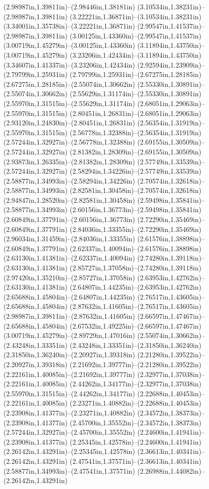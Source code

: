 (2.98987in,1.39811in)--(2.98446in,1.38181in) (3.10534in,1.38231in)--(2.98987in,1.39811in) (3.22221in,1.36871in)--(3.10534in,1.38231in) (3.34001in,1.35738in)--(3.22221in,1.36871in) (2.99547in,1.41537in)--(2.98987in,1.39811in) (3.00125in,1.43360in)--(2.99547in,1.41537in) (3.00719in,1.45279in)--(3.00125in,1.43360in) (3.11894in,1.43750in)--(3.00719in,1.45279in) (3.23206in,1.42434in)--(3.11894in,1.43750in) (3.34607in,1.41337in)--(3.23206in,1.42434in) (2.92594in,1.23909in)--(2.79799in,1.25931in) (2.79799in,1.25931in)--(2.67275in,1.28185in) (2.67275in,1.28185in)--(2.55074in,1.30662in) (2.55330in,1.30891in)--(2.55074in,1.30662in) (2.55629in,1.31174in)--(2.55330in,1.30891in) (2.55970in,1.31515in)--(2.55629in,1.31174in) (2.68051in,1.29063in)--(2.55970in,1.31515in) (2.80451in,1.26831in)--(2.68051in,1.29063in) (2.93120in,1.24830in)--(2.80451in,1.26831in) (2.56354in,1.31919in)--(2.55970in,1.31515in) (2.56778in,1.32388in)--(2.56354in,1.31919in) (2.57244in,1.32927in)--(2.56778in,1.32388in) (2.69155in,1.30509in)--(2.57244in,1.32927in) (2.81382in,1.28309in)--(2.69155in,1.30509in) (2.93873in,1.26335in)--(2.81382in,1.28309in) (2.57749in,1.33539in)--(2.57244in,1.32927in) (2.58294in,1.34226in)--(2.57749in,1.33539in) (2.58877in,1.34993in)--(2.58294in,1.34226in) (2.70574in,1.32618in)--(2.58877in,1.34993in) (2.82581in,1.30458in)--(2.70574in,1.32618in) (2.94847in,1.28520in)--(2.82581in,1.30458in) (2.59498in,1.35841in)--(2.58877in,1.34993in) (2.60156in,1.36773in)--(2.59498in,1.35841in) (2.60849in,1.37791in)--(2.60156in,1.36773in) (2.72290in,1.35469in)--(2.60849in,1.37791in) (2.84036in,1.33355in)--(2.72290in,1.35469in) (2.96034in,1.31459in)--(2.84036in,1.33355in) (2.61576in,1.38898in)--(2.60849in,1.37791in) (2.62337in,1.40094in)--(2.61576in,1.38898in) (2.63130in,1.41381in)--(2.62337in,1.40094in) (2.74280in,1.39118in)--(2.63130in,1.41381in) (2.85727in,1.37058in)--(2.74280in,1.39118in) (2.97420in,1.35210in)--(2.85727in,1.37058in) (2.63953in,1.42762in)--(2.63130in,1.41381in) (2.64807in,1.44235in)--(2.63953in,1.42762in) (2.65688in,1.45804in)--(2.64807in,1.44235in) (2.76517in,1.43605in)--(2.65688in,1.45804in) (2.87632in,1.41605in)--(2.76517in,1.43605in) (2.98987in,1.39811in)--(2.87632in,1.41605in) (2.66597in,1.47467in)--(2.65688in,1.45804in) (2.67532in,1.49225in)--(2.66597in,1.47467in) (3.00719in,1.45279in)--(2.89729in,1.47016in) (2.55074in,1.30662in)--(2.43248in,1.33351in) (2.43248in,1.33351in)--(2.31850in,1.36240in) (2.31850in,1.36240in)--(2.20927in,1.39318in) (2.21280in,1.39522in)--(2.20927in,1.39318in) (2.21692in,1.39777in)--(2.21280in,1.39522in) (2.22161in,1.40085in)--(2.21692in,1.39777in) (2.32977in,1.37038in)--(2.22161in,1.40085in) (2.44262in,1.34177in)--(2.32977in,1.37038in) (2.55970in,1.31515in)--(2.44262in,1.34177in) (2.22688in,1.40453in)--(2.22161in,1.40085in) (2.23271in,1.40882in)--(2.22688in,1.40453in) (2.23908in,1.41377in)--(2.23271in,1.40882in) (2.34572in,1.38373in)--(2.23908in,1.41377in) (2.45700in,1.35552in)--(2.34572in,1.38373in) (2.57244in,1.32927in)--(2.45700in,1.35552in) (2.24600in,1.41941in)--(2.23908in,1.41377in) (2.25345in,1.42578in)--(2.24600in,1.41941in) (2.26142in,1.43291in)--(2.25345in,1.42578in) (2.36613in,1.40341in)--(2.26142in,1.43291in) (2.47541in,1.37571in)--(2.36613in,1.40341in) (2.58877in,1.34993in)--(2.47541in,1.37571in) (2.26988in,1.44082in)--(2.26142in,1.43291in) 